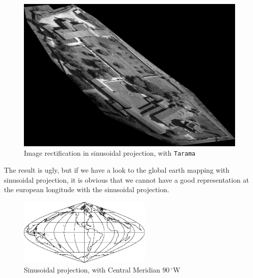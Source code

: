 \begin{figure}[H]
\begin{center}
\includegraphics[width=150mm]{FIGS/Cuxa/Sinus-Ortho-Eg-Test-Redr.jpg}
\caption{Image rectification in sinusoidal projection, with {\tt Tarama}}
\end{center}
\end{figure}


The result is ugly, but if we have a look to the global earth mapping with sinusoidal projection, it is obvious that we cannot have a good representation at the european longitude with the sinusoidal projection.

\begin{figure}[H]
\begin{center}
\includegraphics[width=182pt]{FIGS/Cuxa/Sinus90.jpg}
\caption{Sinusoidal projection, with Central Meridian $90\,^{\circ}$W}
\end{center}
\end{figure}


